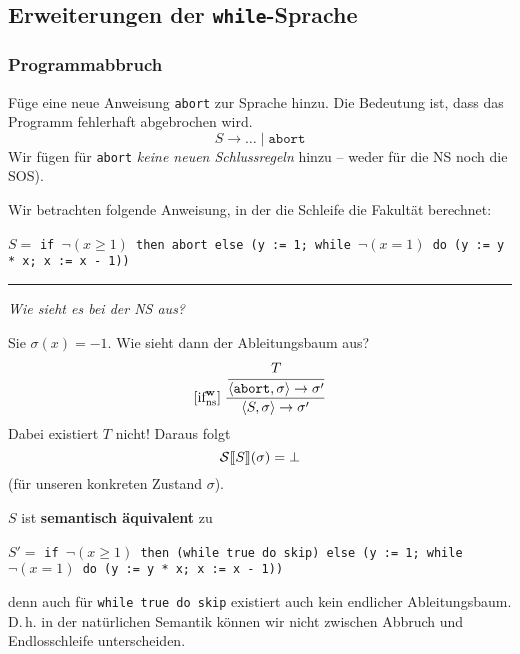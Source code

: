 \begin{lemma}[Determiniertheit]
\subsection{Erweiterungen der \texttt{while}-Sprache}


\subsubsection{Programmabbruch}

Füge eine neue Anweisung \texttt{abort} zur Sprache hinzu. Die Bedeutung ist, dass das Programm fehlerhaft abgebrochen wird.
\[
    S \to \dots \;\vert\; \texttt{abort}
\]
Wir fügen für \texttt{abort} \emph{keine neuen Schlussregeln} hinzu -- weder für die NS noch die SOS).

\begin{example}
    Wir betrachten folgende Anweisung, in der die Schleife die Fakultät berechnet:

    $S =$ \texttt{if $\neg(x \geq 1)$ then abort else (y := 1; while $\neg(x = 1)$ do (y := y * x; x := x - 1))}

    \par\bigskip
    \hrule
    \emph{Wie sieht es bei der NS aus?}

    Sie $\sigma(x) = -1$. Wie sieht dann der Ableitungsbaum aus?
    \begin{align*}
        \infruleNs[\true]{if}\; \frac{
            \cfrac{
                T
            }{
                \strans{\texttt{abort}}{\sigma}{\sigma'}
            }
        }{
            \strans{S}{\sigma}{\sigma'}
        }
    \end{align*}
    Dabei existiert $T$ nicht! Daraus folgt \[
        \Ssem{S}(\sigma) = \bot
    \] (für unseren konkreten Zustand $\sigma$).

    $S$ ist \textbf{semantisch äquivalent} zu

    $S' =$ \texttt{if $\neg(x \geq 1)$ then (while true do skip) else (y := 1; while $\neg(x = 1)$ do (y := y * x; x := x - 1))}

    denn auch für \texttt{while true do skip} existiert auch kein endlicher Ableitungsbaum. D.\,h. in der natürlichen Semantik können wir nicht zwischen Abbruch und Endlosschleife unterscheiden.


\end{example}
\end{lemma}
